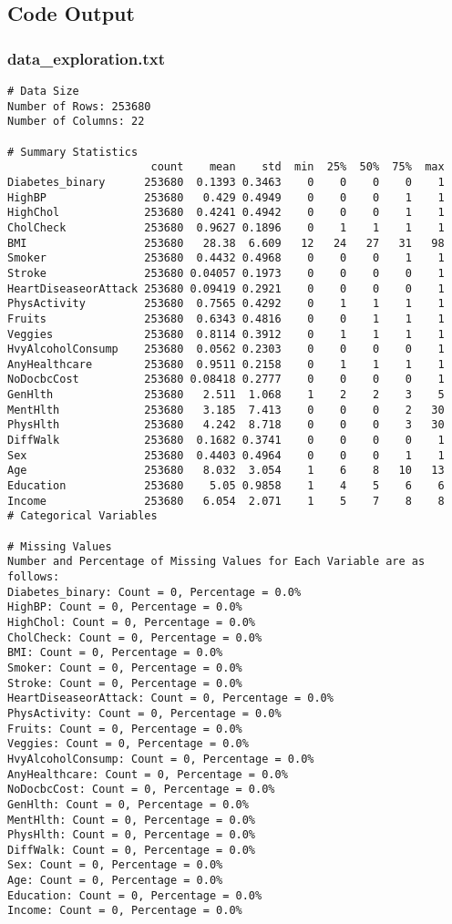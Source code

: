 \documentclass[11pt]{article}
\begin{document}
\subsection{Code Output}

\subsubsection*{data\_exploration.txt}

\begin{Verbatim}[tabsize=4]
# Data Size
Number of Rows: 253680
Number of Columns: 22

# Summary Statistics
                      count    mean    std  min  25%  50%  75%  max
Diabetes_binary      253680  0.1393 0.3463    0    0    0    0    1
HighBP               253680   0.429 0.4949    0    0    0    1    1
HighChol             253680  0.4241 0.4942    0    0    0    1    1
CholCheck            253680  0.9627 0.1896    0    1    1    1    1
BMI                  253680   28.38  6.609   12   24   27   31   98
Smoker               253680  0.4432 0.4968    0    0    0    1    1
Stroke               253680 0.04057 0.1973    0    0    0    0    1
HeartDiseaseorAttack 253680 0.09419 0.2921    0    0    0    0    1
PhysActivity         253680  0.7565 0.4292    0    1    1    1    1
Fruits               253680  0.6343 0.4816    0    0    1    1    1
Veggies              253680  0.8114 0.3912    0    1    1    1    1
HvyAlcoholConsump    253680  0.0562 0.2303    0    0    0    0    1
AnyHealthcare        253680  0.9511 0.2158    0    1    1    1    1
NoDocbcCost          253680 0.08418 0.2777    0    0    0    0    1
GenHlth              253680   2.511  1.068    1    2    2    3    5
MentHlth             253680   3.185  7.413    0    0    0    2   30
PhysHlth             253680   4.242  8.718    0    0    0    3   30
DiffWalk             253680  0.1682 0.3741    0    0    0    0    1
Sex                  253680  0.4403 0.4964    0    0    0    1    1
Age                  253680   8.032  3.054    1    6    8   10   13
Education            253680    5.05 0.9858    1    4    5    6    6
Income               253680   6.054  2.071    1    5    7    8    8
# Categorical Variables

# Missing Values
Number and Percentage of Missing Values for Each Variable are as follows:
Diabetes_binary: Count = 0, Percentage = 0.0%
HighBP: Count = 0, Percentage = 0.0%
HighChol: Count = 0, Percentage = 0.0%
CholCheck: Count = 0, Percentage = 0.0%
BMI: Count = 0, Percentage = 0.0%
Smoker: Count = 0, Percentage = 0.0%
Stroke: Count = 0, Percentage = 0.0%
HeartDiseaseorAttack: Count = 0, Percentage = 0.0%
PhysActivity: Count = 0, Percentage = 0.0%
Fruits: Count = 0, Percentage = 0.0%
Veggies: Count = 0, Percentage = 0.0%
HvyAlcoholConsump: Count = 0, Percentage = 0.0%
AnyHealthcare: Count = 0, Percentage = 0.0%
NoDocbcCost: Count = 0, Percentage = 0.0%
GenHlth: Count = 0, Percentage = 0.0%
MentHlth: Count = 0, Percentage = 0.0%
PhysHlth: Count = 0, Percentage = 0.0%
DiffWalk: Count = 0, Percentage = 0.0%
Sex: Count = 0, Percentage = 0.0%
Age: Count = 0, Percentage = 0.0%
Education: Count = 0, Percentage = 0.0%
Income: Count = 0, Percentage = 0.0%


\end{Verbatim}
\end{document}
